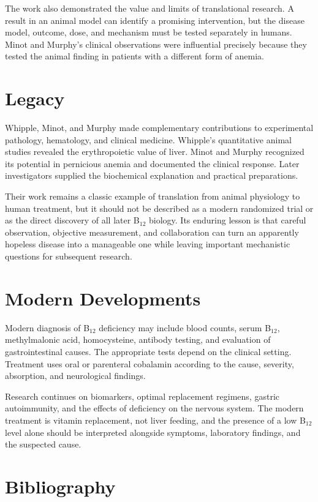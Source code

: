 The work also demonstrated the value and limits of translational research. A result in an animal model can identify a promising intervention, but the disease model, outcome, dose, and mechanism must be tested separately in humans. Minot and Murphy's clinical observations were influential precisely because they tested the animal finding in patients with a different form of anemia.

\section{Legacy}

Whipple, Minot, and Murphy made complementary contributions to experimental pathology, hematology, and clinical medicine. Whipple's quantitative animal studies revealed the erythropoietic value of liver. Minot and Murphy recognized its potential in pernicious anemia and documented the clinical response. Later investigators supplied the biochemical explanation and practical preparations.

Their work remains a classic example of translation from animal physiology to human treatment, but it should not be described as a modern randomized trial or as the direct discovery of all later B$_{12}$ biology. Its enduring lesson is that careful observation, objective measurement, and collaboration can turn an apparently hopeless disease into a manageable one while leaving important mechanistic questions for subsequent research.

\section{Modern Developments}

Modern diagnosis of B$_{12}$ deficiency may include blood counts, serum B$_{12}$, methylmalonic acid, homocysteine, antibody testing, and evaluation of gastrointestinal causes. The appropriate tests depend on the clinical setting. Treatment uses oral or parenteral cobalamin according to the cause, severity, absorption, and neurological findings.

Research continues on biomarkers, optimal replacement regimens, gastric autoimmunity, and the effects of deficiency on the nervous system. The modern treatment is vitamin replacement, not liver feeding, and the presence of a low B$_{12}$ level alone should be interpreted alongside symptoms, laboratory findings, and the suspected cause.

\section{Bibliography}


